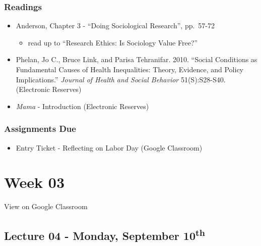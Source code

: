 \documentclass[]{book}
\providecommand{\tightlist}{%
  \setlength{\itemsep}{0pt}\setlength{\parskip}{0pt}}
\theoremstyle{definition}
\theoremstyle{definition}
\theoremstyle{definition}
\theoremstyle{remark}
\begin{document}
\hypertarget{readings-3}{%
\subsubsection*{Readings}\label{readings-3}}

\begin{itemize}
\tightlist
\item
  Anderson, Chapter 3 - ``Doing Sociological Research'', pp.~57-72

  \begin{itemize}
  \tightlist
  \item
    read up to ``Research Ethics: Is Sociology Value Free?''
  \end{itemize}
\item
  Phelan, Jo C., Bruce Link, and Parisa Tehranifar. 2010. ``Social
  Conditions as Fundamental Causes of Health Inequalities: Theory,
  Evidence, and Policy Implications.'' \emph{Journal of Health and
  Social Behavior} 51(S):S28-S40. (Electronic Reserves)
\item
  \emph{Mama} - Introduction (Electronic Reserves)
\end{itemize}

\hypertarget{assignments-due-1}{%
\subsubsection*{Assignments Due}\label{assignments-due-1}}

\begin{itemize}
\tightlist
\item
  Entry Ticket - Reflecting on Labor Day (Google Classroom)
\end{itemize}

\hypertarget{week-03}{%
\section*{Week 03}\label{week-03}}

View on Google Classroom

\hypertarget{lecture-04---monday-september-10th}{%
\subsection*{\texorpdfstring{Lecture 04 - Monday, September
10\textsuperscript{th}}{Lecture 04 - Monday, September 10th}}\label{lecture-04---monday-september-10th}}
\end{document}
